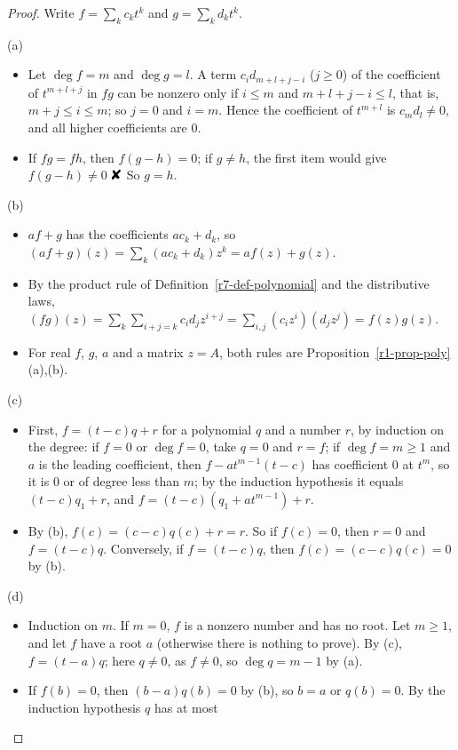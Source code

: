 \documentclass[12pt]{article}
\newcommand{\contradiction}{\mathord{\text{\large\ding{56}}}}
\theoremstyle{definition}
\begin{document}
\begin{proof}
Write \(f=\sum_kc_kt^k\) and \(g=\sum_kd_kt^k\).

(a)
\begin{itemize}
\item Let \(\deg f=m\) and \(\deg g=l\). A term \(c_id_{m+l+j-i}\) (\(j\geqslant0\)) of the coefficient of \(t^{m+l+j}\) in
\(fg\) can be nonzero only if \(i\leqslant m\) and \(m+l+j-i\leqslant l\), that is, \(m+j\leqslant i\leqslant m\); so
\(j=0\) and \(i=m\). Hence the coefficient of \(t^{m+l}\) is \(c_md_l\ne0\), and all higher coefficients are \(0\).
\item If \(fg=fh\), then \(f(g-h)=0\); if \(g\ne h\), the first item would give \(f(g-h)\ne0\) \(\contradiction\) So
\(g=h\).
\end{itemize}
(b)
\begin{itemize}
\item \(af+g\) has the coefficients \(ac_k+d_k\), so \((af+g)(z)=\sum_k(ac_k+d_k)z^k=af(z)+g(z)\).
\item By the product rule of Definition~\ref{r7-def-polynomial} and the distributive laws,
\((fg)(z)=\sum_k\sum_{i+j=k}c_id_jz^{i+j}=\sum_{i,j}(c_iz^i)(d_jz^j)=f(z)g(z)\).
\item For real \(f\), \(g\), \(a\) and a matrix \(z=A\), both rules are Proposition~\ref{r1-prop-poly}(a),(b).
\end{itemize}
(c)
\begin{itemize}
\item First, \(f=(t-c)q+r\) for a polynomial \(q\) and a number \(r\), by induction on the degree: if \(f=0\) or
\(\deg f=0\), take \(q=0\) and \(r=f\); if \(\deg f=m\geqslant1\) and \(a\) is the leading coefficient, then
\(f-at^{m-1}(t-c)\) has coefficient \(0\) at \(t^m\), so it is \(0\) or of degree less than \(m\); by the induction
hypothesis it equals \((t-c)q_1+r\), and \(f=(t-c)(q_1+at^{m-1})+r\).
\item By (b), \(f(c)=(c-c)q(c)+r=r\). So if \(f(c)=0\), then \(r=0\) and \(f=(t-c)q\). Conversely, if \(f=(t-c)q\), then
\(f(c)=(c-c)q(c)=0\) by (b).
\end{itemize}
(d)
\begin{itemize}
\item Induction on \(m\). If \(m=0\), \(f\) is a nonzero number and has no root. Let \(m\geqslant1\), and let \(f\) have a
root \(a\) (otherwise there is nothing to prove). By (c), \(f=(t-a)q\); here \(q\ne0\), as \(f\ne0\), so \(\deg q=m-1\)
by (a).
\item If \(f(b)=0\), then \((b-a)q(b)=0\) by (b), so \(b=a\) or \(q(b)=0\). By the induction hypothesis \(q\) has at most

\end{itemize}
\end{proof}
\end{document}

